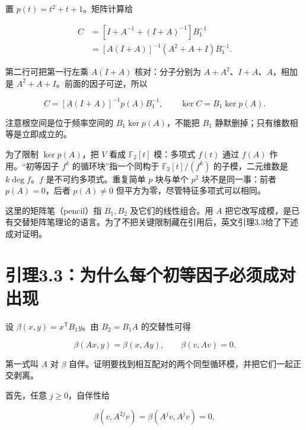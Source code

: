 \documentclass[UTF8,fontset=fandol,zihao=-4,openany,oneside]{ctexbook}
\begin{document}
置 \(p(t)=t^2+t+1\)。矩阵计算给



\[
\begin{aligned}
C&=[I+A^{-1}+(I+A)^{-1}]B_1^{-1}\\
&=[A(I+A)]^{-1}(A^2+A+I)B_1^{-1}.
\end{aligned}
\]



第二行可把第一行左乘 \(A(I+A)\) 核对：分子分别为 \(A+A^2\)、\(I+A\)、\(A\)，相加是 \(A^2+A+I\)。前面的因子可逆，所以



\[
C=[A(I+A)]^{-1}p(A)B_1^{-1},\qquad
\ker C=B_1\ker p(A).\tag{英文(3.6)}
\]



注意根空间是位于频率空间的 \(B_1\ker p(A)\)，不能把 \(B_1\) 静默删掉；只有维数相等是立即成立的。



为了限制 \(\ker p(A)\)，把 \(V\) 看成 \(\mathbb F_2[t]\) 模：多项式 \(f(t)\) 通过 \(f(A)\) 作用。“初等因子 \(f^k\) 的循环块”指一个同构于 \(\mathbb F_2[t]/(f^k)\) 的子模，二元维数是 \(k\deg f\)。\(f\) 是不可约多项式。重复简单 \(p\) 块与单个 \(p^2\) 块不是同一事：前者 \(p(A)=0\)，后者 \(p(A)\ne0\) 但平方为零，尽管特征多项式可以相同。



这里的矩阵笔（pencil）指 \(B_1,B_2\) 及它们的线性组合。用 \(A\) 把它改写成模，是已有交替矩阵笔理论的语言。为了不把关键限制藏在引用后，英文引理3.3给了下述成对证明。



\section{引理3.3：为什么每个初等因子必须成对出现}


设 \(\beta(x,y)=x^{\mathsf T}B_1y\)。由 \(B_2=B_1A\) 的交替性可得



\[
\beta(Ax,y)=\beta(x,Ay),\qquad \beta(v,Av)=0.
\]



第一式叫 \(A\) 对 \(\beta\) 自伴。证明要找到相互配对的两个同型循环模，并把它们一起正交剥离。



首先，任意 \(j\ge0\)，自伴性给



\[
\beta(v,A^{2j}v)=\beta(A^jv,A^jv)=0,
\]
\end{document}
